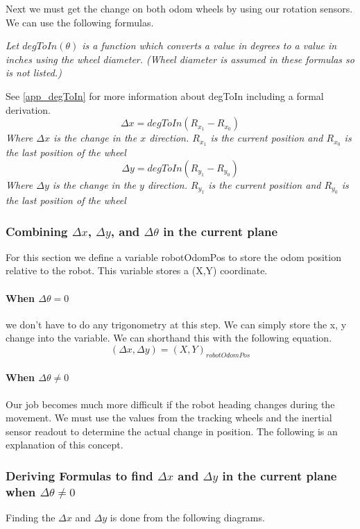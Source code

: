 \documentclass[12pt]{article}
\begin{document}
Next we must get the change on both odom wheels by using our rotation sensors. We can use the following formulas.

\textit{Let $degToIn(\theta)$ is a function which converts a value in degrees to a value in inches using the wheel diameter. (Wheel diameter is assumed in these formulas so is not listed.)}

See \ref{app_degToIn} for more information about degToIn including a formal derivation.
$$
    \Delta x = degToIn(R_{x_1} - R_{x_0})
$$
\textit{Where $\Delta x$ is the change in the $x$ direction. $R_{x_1}$ is the current position and $R_{x_0}$ is the last position of the wheel}
$$
    \Delta y = degToIn(R_{y_1} - R_{y_0})
$$
\textit{Where $\Delta y$ is the change in the $y$ direction. $R_{y_1}$ is the current position and $R_{y_0}$ is the last position of the wheel}

\subsubsection{Combining $\Delta x$, $\Delta y$, and $\Delta\theta$ in the current plane}
    For this section we define a variable robotOdomPos to store the odom position relative to the robot. This variable stores a (X,Y) coordinate.
\paragraph{When $\Delta\theta = 0$}
    we don't have to do any trigonometry at this step. We can simply store the x, y change into the variable. We can shorthand this with the following equation.
    $$ (\Delta x, \Delta y) = (X,Y)_{robotOdomPos} $$
\paragraph{When $\Delta\theta \neq 0$}\label{deltaneqtheta}
Our job becomes much more difficult if the robot heading changes during the movement. We must use the values from the tracking wheels and the inertial sensor readout to determine the actual change in position. The following is an explanation of this concept.

\subsubsection{Deriving Formulas to find $\Delta x$ and $\Delta y$ in the current plane when $\Delta\theta \neq 0$} \label{app_trighell}

Finding the $\Delta x$ and $\Delta y$ is done from the following diagrams.
\end{document}
